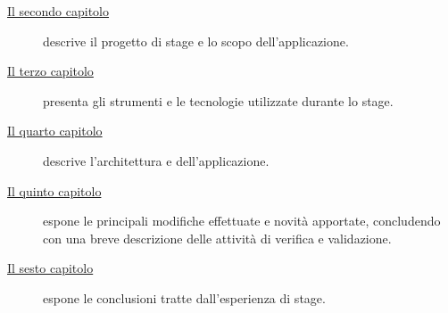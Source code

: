 \begin{description} 
    \item[{\hyperref[cap:descrizione-stage]{Il secondo capitolo}}] descrive il progetto di stage e lo scopo dell'applicazione.
    
    \item[{\hyperref[cap:tecnologie-strumenti]{Il terzo capitolo}}] presenta gli strumenti e le tecnologie utilizzate durante lo stage.
    
    \item[{\hyperref[cap:design]{Il quarto capitolo}}] descrive l'architettura e dell'applicazione.
    
    \item[{\hyperref[cap:codifica]{Il quinto capitolo}}] espone le principali modifiche effettuate e novità apportate, concludendo con una breve descrizione delle attività di verifica e validazione.
    
    \item[{\hyperref[cap:conclusioni]{Il sesto capitolo}}] espone le conclusioni tratte dall'esperienza di stage.
\end{description}
